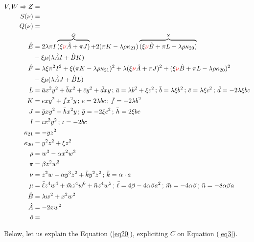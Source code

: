 \documentclass[12pt]{article}
\numberwithin{table}{section}
\begin{document}
\begin{align}
V,W\Rightarrow Z&=\\
S(\nu)&=\\
Q(\nu)&=\\
\hat E &= 2\lambda \pi I\overbrace{(\xi {\color{red}\nu} \hat A + \pi J)}^{Q} + 2(\pi K - \lambda \rho \kappa_{21})\overbrace{(\xi {\color{red}\nu} \hat B + \pi L - \lambda \rho \kappa_{20})}^{S}  \\
&- \xi \mu (\lambda \hat AI  + \hat BK  )\\
\hat F &= \lambda\xi \pi^2 I^2 +\xi (\pi K - \lambda \rho \kappa_{21})^2 + \lambda (\xi {\color{red}\nu} \hat A + \pi J)^2 + (\xi {\color{red}\nu} \hat B + \pi L - \lambda \rho \kappa_{20})^2 \\
&- \xi \mu (\lambda \hat A J + \hat B L) \\
L &= \bar a x^2 y^2 + \bar b x^2 + \bar c y^2 + \bar d xy \,;\,\bar a = \lambda b^2 + \xi c^2\,;\,\bar b = \lambda \xi b^2\,;\,\bar c = \lambda \xi c^2\,;\,\bar d = -2 \lambda \xi bc \\
K &= \bar e xy^2 + \bar f x^2 y \,;\,\bar e = 2 \lambda bc \,;\,\bar f = -2\lambda b^2 \\
J &= \bar g xy^2 + \bar h x^2 y \,;\,\bar g = -2\xi c^2 \,;\,\bar h = 2\xi bc \\
I &= \bar \iota x^2 y^2 \,;\, \bar \iota = -2bc \\
\kappa_{21} &= -yz^2 \\
\kappa_{20} &= y^2 z^2 + \xi z^2\\
\rho &= w^3 - \alpha x^2 w^3\\
\pi &= \beta z^2w^3\\
\nu &= z^2 w - \alpha y^3 z^2 + \bar k y^2 z^2\,;\,\bar k = \alpha \cdot a\\
\mu &= \bar \ell z^4 w^4 + \bar m z^4 w^6 + \bar n z^4 w^5 \,;\,\bar \ell = 4\beta   -4\alpha\beta a^2 \,;\,\bar m = -4\alpha\beta \,;\,\bar n = - 8\alpha\beta a \\
\hat B &= \lambda w^2 + x^2 w^2\\
\hat A &= -2xw^2 \\
\bar o &=
\end{align}

\newpage

Below, let us explain the Equation (\ref{eq20}), expliciting $C$ on Equation (\ref{eq3}).
\end{document}
